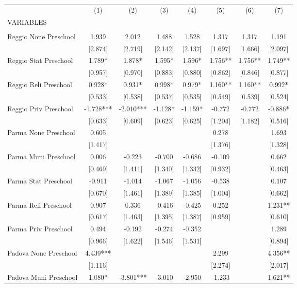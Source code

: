 \begin{tabular}{lccccccc} \hline
 & (1) & (2) & (3) & (4) & (5) & (6) & (7) \\
VARIABLES &  &  &  &  &  &  &  \\ \hline
 &  &  &  &  &  &  &  \\
Reggio None Preschool & 1.939 & 2.012 & 1.488 & 1.528 & 1.317 & 1.317 & 1.191 \\
 & [2.874] & [2.719] & [2.142] & [2.137] & [1.697] & [1.666] & [2.097] \\
Reggio Stat Preschool & 1.789* & 1.878* & 1.595* & 1.596* & 1.756** & 1.756** & 1.749** \\
 & [0.957] & [0.970] & [0.883] & [0.880] & [0.862] & [0.846] & [0.877] \\
Reggio Reli Preschool & 0.928* & 0.931* & 0.998* & 0.979* & 1.160** & 1.160** & 0.992* \\
 & [0.533] & [0.538] & [0.537] & [0.535] & [0.549] & [0.539] & [0.524] \\
Reggio Priv Preschool & -1.728*** & -2.010*** & -1.128* & -1.159* & -0.772 & -0.772 & -0.886* \\
 & [0.633] & [0.609] & [0.623] & [0.625] & [1.204] & [1.182] & [0.516] \\
Parma None Preschool & 0.605 &  &  &  & 0.278 &  & 1.693 \\
 & [1.417] &  &  &  & [1.376] &  & [1.328] \\
Parma Muni Preschool & 0.006 & -0.223 & -0.700 & -0.686 & -0.109 &  & 0.662 \\
 & [0.469] & [1.411] & [1.340] & [1.332] & [0.932] &  & [0.463] \\
Parma Stat Preschool & -0.911 & -1.014 & -1.067 & -1.056 & -0.538 &  & 0.107 \\
 & [0.670] & [1.461] & [1.389] & [1.385] & [1.004] &  & [0.662] \\
Parma Reli Preschool & 0.907 & 0.336 & -0.416 & -0.425 & 0.252 &  & 1.231** \\
 & [0.617] & [1.463] & [1.395] & [1.387] & [0.959] &  & [0.610] \\
Parma Priv Preschool & 0.494 & -0.192 & -0.274 & -0.352 &  &  & 1.289 \\
 & [0.966] & [1.622] & [1.546] & [1.531] &  &  & [0.894] \\
Padova None Preschool & 4.439*** &  &  &  & 2.299 &  & 4.356** \\
 & [1.116] &  &  &  & [2.274] &  & [2.017] \\
Padova Muni Preschool & 1.080* & -3.801*** & -3.010 & -2.950 & -1.233 &  & 1.621** \\

\end{tabular}
